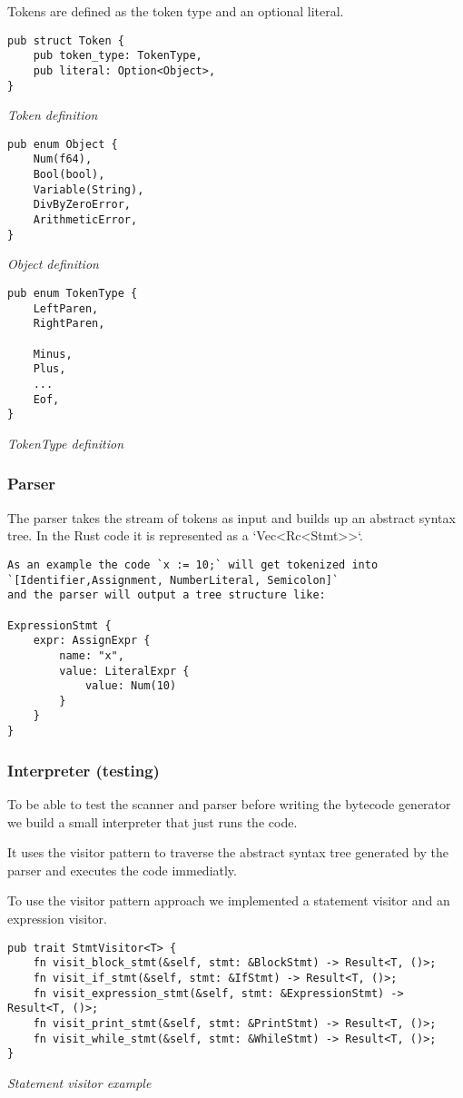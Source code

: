 \documentclass{article}
\begin{document}
Tokens are defined as the token type and an optional literal.

\begin{verbatim}
pub struct Token {
    pub token_type: TokenType,
    pub literal: Option<Object>,
}
\end{verbatim}
\textit{Token definition}

\begin{verbatim}
pub enum Object {
    Num(f64),
    Bool(bool),
    Variable(String),
    DivByZeroError,
    ArithmeticError,
}
\end{verbatim}
\textit{Object definition}

\begin{verbatim}
pub enum TokenType {
    LeftParen,
    RightParen,

    Minus,
    Plus,
    ...
    Eof,
}
\end{verbatim}
\textit{TokenType definition}

\subsubsection{Parser}
The parser takes the stream of tokens as input and builds up an abstract syntax
tree. In the Rust code it is represented as a `Vec<Rc<Stmt>>`.

\begin{verbatim}
As an example the code `x := 10;` will get tokenized into 
`[Identifier,Assignment, NumberLiteral, Semicolon]` 
and the parser will output a tree structure like:

ExpressionStmt {
    expr: AssignExpr {
        name: "x",
        value: LiteralExpr {
            value: Num(10)
        }
    }
}
\end{verbatim}


\subsubsection{Interpreter (testing)}
To be able to test the scanner and parser before writing the bytecode generator
we build a small interpreter that just runs the code.

It uses the visitor pattern to traverse the abstract syntax tree generated by
the parser and executes the code immediatly.

To use the visitor pattern approach we implemented a statement visitor and an
expression visitor.

\begin{verbatim}
pub trait StmtVisitor<T> {
    fn visit_block_stmt(&self, stmt: &BlockStmt) -> Result<T, ()>;
    fn visit_if_stmt(&self, stmt: &IfStmt) -> Result<T, ()>;
    fn visit_expression_stmt(&self, stmt: &ExpressionStmt) -> Result<T, ()>;
    fn visit_print_stmt(&self, stmt: &PrintStmt) -> Result<T, ()>;
    fn visit_while_stmt(&self, stmt: &WhileStmt) -> Result<T, ()>;
}
\end{verbatim}
\textit{Statement visitor example}
\end{document}
